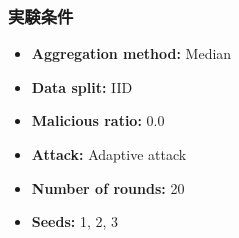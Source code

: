 \documentclass[a4j,twocolumn,dvipdfmx]{jsarticle}
\begin{document}
\subsubsection{実験条件}

\begin{itemize}
    \item \textbf{Aggregation method:} Median
    \item \textbf{Data split:} IID
    \item \textbf{Malicious ratio:} 0.0
    \item \textbf{Attack:} Adaptive attack
    \item \textbf{Number of rounds:} 20
    \item \textbf{Seeds:} 1, 2, 3
\end{itemize}

\end{document}
